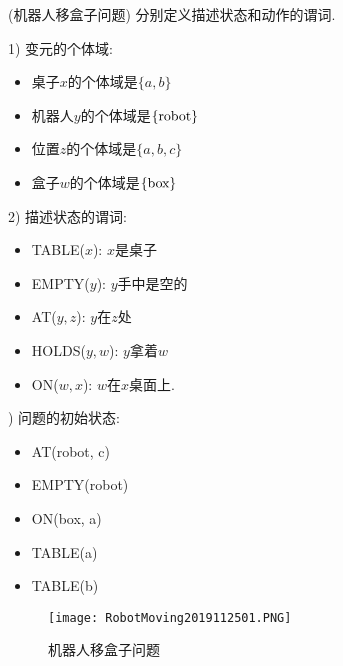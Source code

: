 \begin{example}(机器人移盒子问题)
分别定义描述状态和动作的谓词.

1) 变元的个体域:
\begin{itemize}
\item 桌子$x$的个体域是$\{a, b\}$
\item 机器人$y$的个体域是$\{\textup{robot}\}$
\item 位置$z$的个体域是$\{a, b, c\}$
\item 盒子$w$的个体域是$\{\textup{box}\}$
\end{itemize}

2) 描述状态的谓词:
\begin{itemize}
\item TABLE($x$): $x$是桌子
\item EMPTY($y$): $y$手中是空的
\item AT($y, z$): $y$在$z$处
\item HOLDS($y, w$): $y$拿着$w$
\item ON($w, x$): $w$在$x$桌面上.
\end{itemize}

\begin{minipage}{13.5cm}
{) 问题的初始状态:}
\begin{minipage}{4.5cm}
\begin{itemize}
\item AT(robot, c)
\item EMPTY(robot)
\item ON(box, a)
\item TABLE(a)
\item TABLE(b)
\end{itemize}
\end{minipage}
\begin{minipage}{6cm}
\begin{figure}[H]
\centering
\texttt{[image: RobotMoving2019112501.PNG]}
\caption{机器人移盒子问题}
\label{AI32fig02}
\end{figure}
\end{minipage}
\end{minipage}


\end{example}
